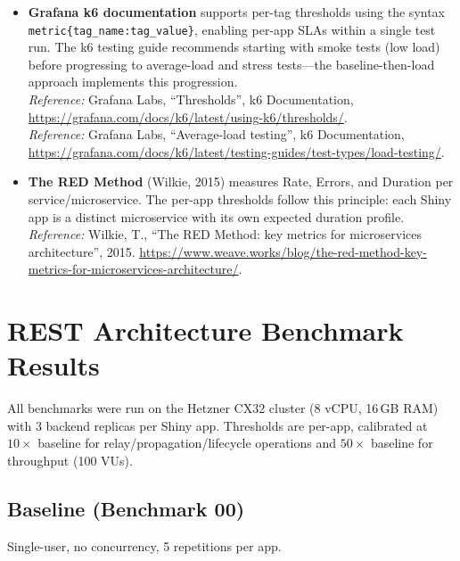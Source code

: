 \documentclass[11pt,a4paper]{article}
\begin{document}
\begin{itemize}
  \item \textbf{Grafana k6 documentation} supports per-tag
        thresholds using the syntax
        \texttt{metric\{tag\_name:tag\_value\}}, enabling per-app
        SLAs within a single test run. The k6 testing guide recommends
        starting with smoke tests (low load) before progressing to
        average-load and stress tests---the baseline-then-load approach
        implements this progression.\\
        \emph{Reference:} Grafana Labs, ``Thresholds'', k6 Documentation,
        \url{https://grafana.com/docs/k6/latest/using-k6/thresholds/}.\\
        \emph{Reference:} Grafana Labs, ``Average-load testing'', k6
        Documentation,
        \url{https://grafana.com/docs/k6/latest/testing-guides/test-types/load-testing/}.

  \item \textbf{The RED Method} (Wilkie, 2015) measures Rate, Errors,
        and Duration per service/microservice. The per-app thresholds
        follow this principle: each Shiny app is a distinct microservice
        with its own expected duration profile.\\
        \emph{Reference:} Wilkie, T., ``The RED Method: key metrics
        for microservices architecture'', 2015.
        \url{https://www.weave.works/blog/the-red-method-key-metrics-for-microservices-architecture/}.
\end{itemize}

\section{REST Architecture Benchmark Results}

All benchmarks were run on the Hetzner CX32 cluster (8 vCPU, 16\,GB RAM)
with 3 backend replicas per Shiny app. Thresholds are per-app,
calibrated at $10\times$ baseline for relay/propagation/lifecycle
operations and $50\times$ baseline for throughput (100 VUs).

\subsection{Baseline (Benchmark 00)}

Single-user, no concurrency, 5 repetitions per app.
\end{document}

